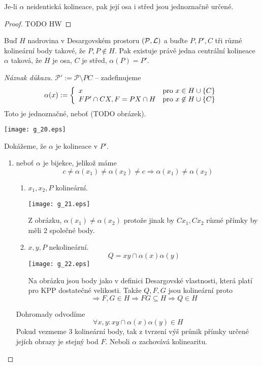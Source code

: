 \begin{consequence}
    Je-li $\alpha$ neidentická kolineace, pak její osa i střed jsou jednoznačně určené.
\end{consequence}
\begin{proof}
    TODO HW
\end{proof}


\begin{theorem}[Baerova]\label{kpp:baer}
    Buď $H$ nadrovina v Desargovském prostoru $(\mathcal{P},\operatorname{\mathcal{L}})$ a buďte $P,P', C$ tři různé kolineární body takové, že $P,P\not\in H$.
    Pak existuje právě jedna centrální kolineace $\alpha$ taková, že $H$ je osa, $C$ je střed, $\alpha(P)=P'$.
\end{theorem}
\begin{proof}[Náznak důkazu]
    $\mathcal{P}':=\mathcal{P}\setminus PC$ -- zadefinujeme
    \[ \alpha(x) := \left\{ \begin{array}{ll} x & \mbox{pro } x\in H\cup \{C\} \\ FP'\cap CX, F=PX\cap H & \mbox{pro } x\not\in H\cup \{C\} \end{array} \right. \]
    Toto je jednoznačné, neboť (TODO obrázek).

    \texttt{[image: g\_20.eps]}

    Dokážeme, že $\alpha$ je kolineace v $P'$.
    \begin{enumerate}
	    \item neboť $\alpha$ je bijekce, jelikož máme
		    \[ c\neq \alpha(x_1)\neq\alpha(x_2)\neq c\Rightarrow \alpha(x_1)\neq\alpha(x_2) \]
    		\begin{enumerate}
			\item $x_1, x_2, P$ kolineární.

    \texttt{[image: g\_21.eps]}

    Z obrázku, $\alpha(x_1)\neq\alpha(x_2)$ protože jinak by $Cx_1, Cx_2$ různé přímky by měli 2 společné body.
			\item $x, y, P$ nekolineární.
				\[ Q = xy \cap \alpha(x)\alpha(y) \]
    \texttt{[image: g\_22.eps]}

    			Na obrázku jsou body jako v definici Desargovské vlastnosti, která platí pro KPP dostatečné velikosti.
			Takže $Q, F, G$ jsou kolineární proto
			\[ \Rightarrow F, G \in H \Rightarrow FG \subseteq H \Rightarrow Q \in H\]

    		\end{enumerate}

		Dohromady odvodíme
		\[ \forall x, y: xy \cap \alpha(x)\alpha(y) \in H \]
		Pokud vezmeme 3 kolineární body, tak z tvrzení výš průnik přímky určené jejích obrazy je stejný bod $F$. Neboli $\alpha$ zachovává kolinearitu.


\end{enumerate}
\end{proof}
